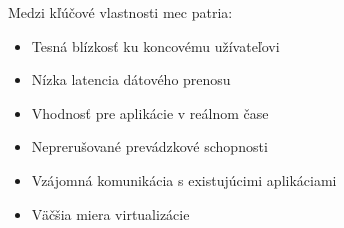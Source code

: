 Medzi kľúčové vlastnosti \acrshort{mec} patria:

\begin{itemize}

    \item Tesná blízkosť ku koncovému užívateľovi
    \item Nízka latencia dátového prenosu
    \item Vhodnosť pre aplikácie v reálnom čase
    \item Neprerušované prevádzkové schopnosti
    \item Vzájomná komunikácia s existujúcimi aplikáciami
    \item Väčšia miera virtualizácie \cite{mec}

\end{itemize}